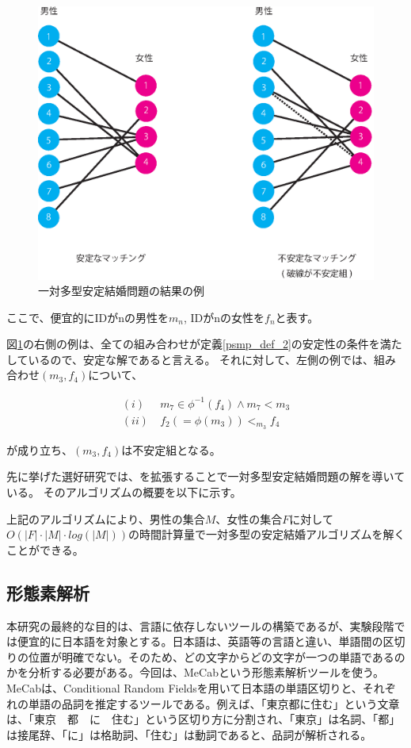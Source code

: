 \documentclass[12pt]{jarticle}
\begin{document}
\begin{figure}
  \begin{center}
    \includegraphics[scale = 0.5]{image/psmp.eps}
  \end{center}
  \caption{一対多型安定結婚問題の結果の例}
  \label{result_of_psmp}
\end{figure}

ここで、便宜的にIDがnの男性を$m_n$, IDがnの女性を$f_n$と表す。

図\ref{result_of_psmp}の右側の例は、全ての組み合わせが定義\ref{psmp_def_2}の安定性の条件を満たしているので、安定な解であると言える。
それに対して、左側の例では、組み合わせ$(m_3, f_4)$について、

\begin{align}
(i)  & \ m_7 \in \phi^{-1} (f_4) \land m_7 < m_3   \\
(ii) & \ f_2(= \phi(m_3)) < _{m_3} f_4
\end{align}

が成り立ち、$(m_3, f_4)$は不安定組となる。

先に挙げた選好研究\cite{psmp}では、\gsa を拡張することで一対多型安定結婚問題の解を導いている。
そのアルゴリズムの概要を以下に示す。



上記のアルゴリズムにより、男性の集合$M$、女性の集合$F$に対して$O(|F| \cdot |M| \cdot log(|M|))$の時間計算量で一対多型の安定結婚アルゴリズムを解くことができる。

\subsection{形態素解析}
本研究の最終的な目的は、言語に依存しないツールの構築であるが、実験段階では便宜的に日本語を対象とする。日本語は、英語等の言語と違い、単語間の区切りの位置が明確でない。そのため、どの文字からどの文字が一つの単語であるのかを分析する必要がある。今回は、MeCab\cite{MeCab}という形態素解析ツールを使う。MeCabは、Conditional Random Fieldsを用いて日本語の単語区切りと、それぞれの単語の品詞を推定するツールである。例えば、「東京都に住む」という文章は、「東京　都　に　住む」という区切り方に分割され、「東京」は名詞、「都」は接尾辞、「に」は格助詞、「住む」は動詞であると、品詞が解析される。
\end{document}
